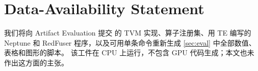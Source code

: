 \section*{Data-Availability Statement}
我们将向 Artifact Evaluation 提交 \sys 的 TVM 实现、算子注册集、用 TE 编写的 Neptune 和 RedFuser 程序，以及可用单条命令重新生成 \cref{sec:eval} 中全部数值、表格和图形的脚本。
该工件在 CPU 上运行，不包含 GPU 代码生成；本文也未作出这方面的主张。
